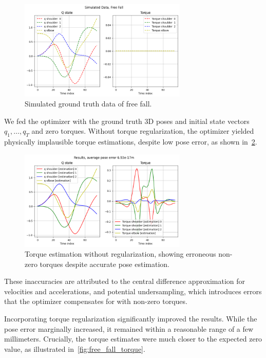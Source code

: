 \begin{figure}
    \centering
    \includegraphics[width=8cm]{figures/free_fall_gt.png}
    \caption{Simulated ground truth data of free fall.}
    \label{fig:gt_free_fall}
\end{figure}

We fed the optimizer with the ground truth 3D poses and initial state vectors \(q_1, \ldots, q_T\) and zero torques. Without torque 
regularization, the optimizer yielded physically implausible torque estimations, despite low pose error, as shown 
in~\cref{fig:free_fall_no_torque}.

\begin{figure}
    \centering
    \includegraphics[width=8cm]{figures/free_fall_no_torque.png}
    \caption{Torque estimation without regularization, showing erroneous non-zero torques despite accurate pose estimation.}
    \label{fig:free_fall_no_torque}
\end{figure}

These inaccuracies are attributed to the central difference approximation for velocities and accelerations, and potential undersampling, which 
introduces errors that the optimizer compensates for with non-zero torques.

Incorporating torque regularization significantly improved the results. While the pose error marginally increased, it remained within a 
reasonable range of a few millimeters. Crucially, the torque estimates were much closer to the expected zero value, as illustrated 
in~\cref{fig:free_fall_torque}.

